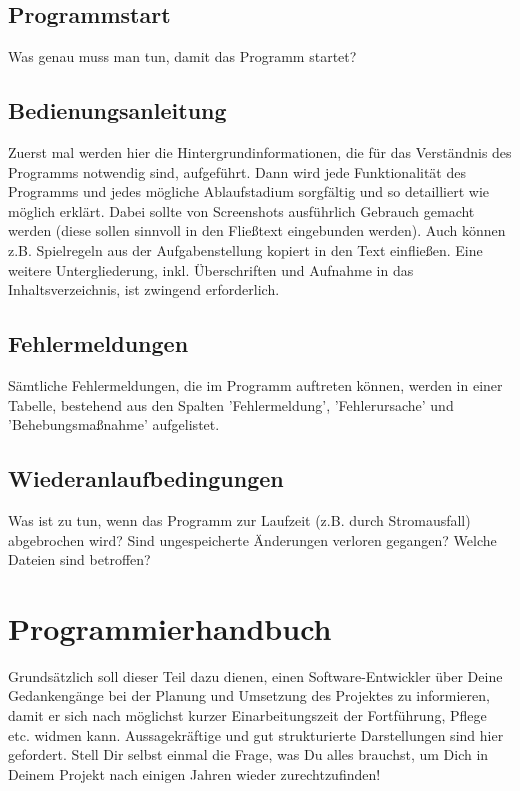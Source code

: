 \documentclass[12pt, letterpaper]{article}
\begin{document}
        \subsection{Programmstart}
            Was genau muss man tun, damit das Programm startet?

        \subsection{Bedienungsanleitung}
            Zuerst mal werden hier die Hintergrundinformationen, die für das Verständnis des Programms notwendig sind, aufgeführt. Dann wird jede Funktionalität des Programms und jedes mögliche Ablaufstadium sorgfältig und so detailliert wie möglich erklärt. Dabei sollte von Screenshots ausführlich Gebrauch gemacht werden (diese sollen sinnvoll in den Fließtext eingebunden werden). Auch können z.B. Spielregeln aus der Aufgabenstellung kopiert in den Text einfließen. Eine weitere Untergliederung, inkl. Überschriften und Aufnahme in das Inhaltsverzeichnis, ist zwingend erforderlich.

        \subsection{Fehlermeldungen}
            Sämtliche Fehlermeldungen, die im Programm auftreten können, werden in einer Tabelle, bestehend aus den Spalten 'Fehlermeldung', 'Fehlerursache' und 'Behebungsmaßnahme' aufgelistet.

        \subsection{Wiederanlaufbedingungen}
            Was ist zu tun, wenn das Programm zur Laufzeit (z.B. durch Stromausfall) abgebrochen wird? Sind ungespeicherte Änderungen verloren gegangen? Welche Dateien sind betroffen?
    \newpage

    \section{Programmierhandbuch}
        Grundsätzlich soll dieser Teil dazu dienen, einen Software-Entwickler über Deine Gedankengänge bei der Planung und Umsetzung des Projektes zu informieren, damit er sich nach möglichst kurzer Einarbeitungszeit der Fortführung, Pflege etc. widmen kann. Aussagekräftige und gut strukturierte Darstellungen sind hier gefordert. Stell Dir selbst einmal die Frage, was Du alles brauchst, um Dich in Deinem Projekt nach einigen Jahren wieder zurechtzufinden!
\end{document}
